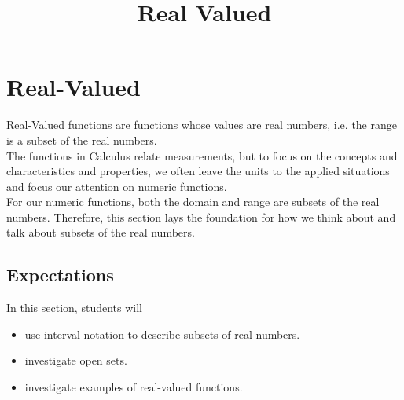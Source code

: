 \documentclass{ximera}
\title{Real Valued}
\begin{document}
\begin{abstract}
\end{abstract}
\maketitle




\section{Real-Valued}


Real-Valued functions are functions whose values are real numbers, i.e. the range is a subset of the real numbers. \\


The functions in Calculus relate measurements, but to focus on the concepts and characteristics and properties, we often leave the units to the applied situations and focus our attention on numeric functions. \\


For our numeric functions, both the domain and range are subsets of the real numbers. Therefore, this section lays the foundation for how we think about and talk about subsets of the real numbers.










\subsection{Expectations}





\begin{sectionOutcomes}
In this section, students will 

\begin{itemize}
\item use interval notation to describe subsets of real numbers.
\item investigate open sets.
\item investigate examples of real-valued functions.
\end{itemize}
\end{sectionOutcomes}
\end{document}
